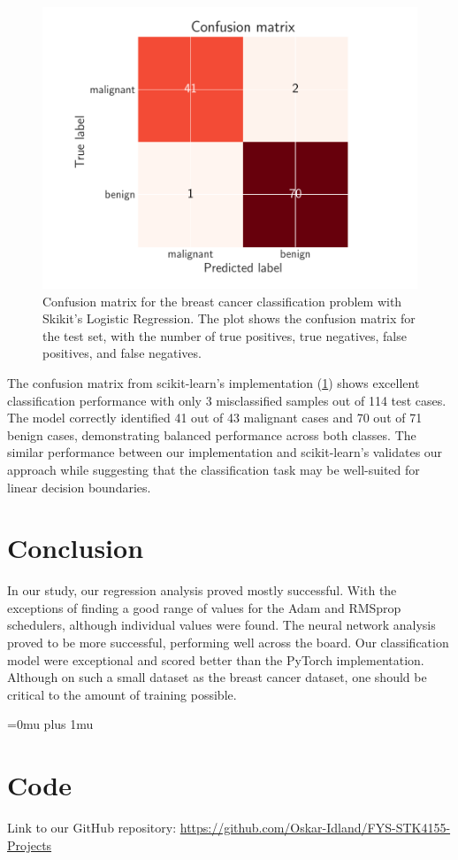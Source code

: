 \documentclass[aps,pra,english,notitlepage,reprint,nofootinbib]{revtex4-1}  %
\begin{document}
\begin{figure}[h!]
    \includegraphics[width =.45\textwidth]{../figs/confusion_matrix.pdf}
    \caption{Confusion matrix for the breast cancer classification problem with Skikit's Logistic Regression. The plot shows the confusion matrix for the test set, with the number of true positives, true negatives, false positives, and false negatives.}
    \label{fig:confusion_matrix}
\end{figure}

The confusion matrix from scikit-learn's implementation (\cref{fig:confusion_matrix}) shows excellent classification performance with only 3 misclassified samples out of 114 test cases. The model correctly identified 41 out of 43 malignant cases and 70 out of 71 benign cases, demonstrating balanced performance across both classes. The similar performance between our implementation and scikit-learn's validates our approach while suggesting that the classification task may be well-suited for linear decision boundaries.


\clearpage

\section{Conclusion}\label{sec:conclusion}
In our study, our regression analysis proved mostly successful. With the exceptions of finding a good range of values for the Adam and RMSprop schedulers, although individual values were found. The neural network analysis proved to be more successful, performing well across the board. Our classification model were exceptional and scored better than the PyTorch implementation. Although on such a small dataset as  the breast cancer dataset, one should be critical to the amount of training possible.



\Urlmuskip=0mu plus 1mu\relax
\onecolumngrid


\newpage
\section{Code}\label{appsec:code}
Link to our GitHub repository: \href{https://github.com/Oskar-Idland/FYS-STK4155-Projects}{https://github.com/Oskar-Idland/FYS-STK4155-Projects}
\end{document}
